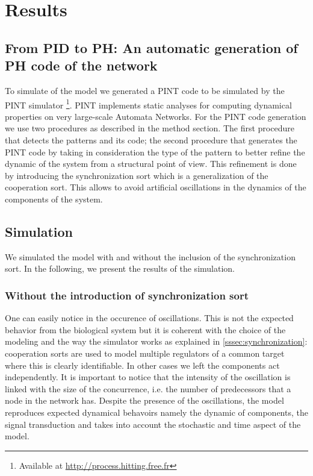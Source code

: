
\section{Results}

\subsection{From PID to PH: An automatic generation of PH code of the network}

To simulate of the model we generated a PINT code to be simulated by the PINT simulator \footnote{Available at \url{http://process.hitting.free.fr}}. 
PINT implements static analyses for computing dynamical properties on very large-scale Automata Networks.
For the PINT code generation we use two procedures as described in the method section. The first procedure that detects the patterns and its code; the second 
procedure that generates the PINT code by taking in consideration the type of the pattern to better refine the dynamic of the system from a structural point of view.
This refinement is done by introducing the synchronization sort  which is a generalization of the cooperation sort. This allows  to avoid artificial oscillations
in the dynamics of the components of the system.




\subsection{Simulation}

We simulated the model with and without the inclusion of the synchronization sort. In the following, we present the results of 
the simulation.

\subsubsection{Without the introduction of synchronization sort}
One can easily notice in  the occurence of oscillations. This is not the expected behavior from the biological system
but it is coherent with the choice of the modeling and the way the simulator works as explained in \ref{sssec:synchronization}: cooperation
sorts are used to model multiple regulators of a common target
where this is clearly identifiable. In other cases we left the components act independently.
It is important to notice that the intensity of the oscillation is linked with 
the size of the concurrence, i.e. the number of predecessors that a node in the network has.
Despite the presence of the oscillations, the model reproduces expected dynamical behavoirs  namely
the dynamic of components, the signal transduction and takes into account the stochastic and time aspect of the model.

